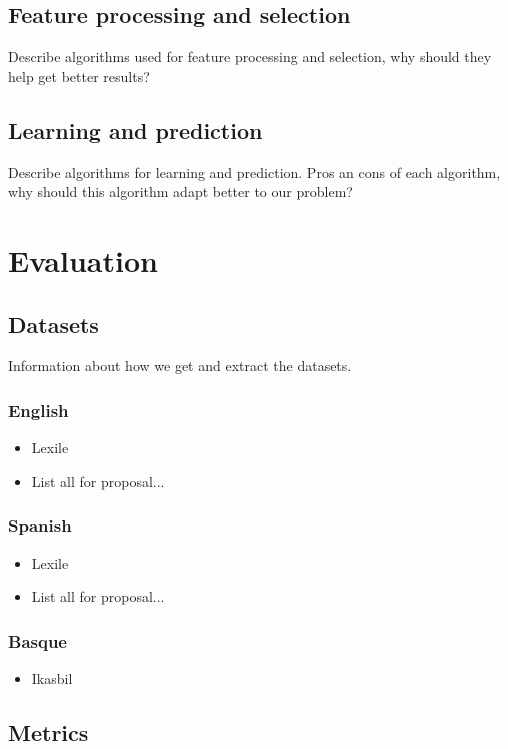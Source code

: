\documentclass[12pt]{article}
\begin{document}
\subsection{Feature processing and selection}
Describe algorithms used for feature processing and selection, why should they help get better results?

\subsection{Learning and prediction}
Describe algorithms for learning and prediction. Pros an cons of each algorithm, why should this algorithm adapt better to our problem?

\section{Evaluation}

\subsection{Datasets}
Information about how we get and extract the datasets.
\subsubsection{English}
\begin{itemize}
\item Lexile
\item List all for proposal...
\end{itemize}
\subsubsection{Spanish}
\begin{itemize}
\item Lexile
\item List all for proposal...
\end{itemize}
\subsubsection{Basque}
\begin{itemize}
\item Ikasbil
\end{itemize}

\subsection{Metrics}
\end{document}
